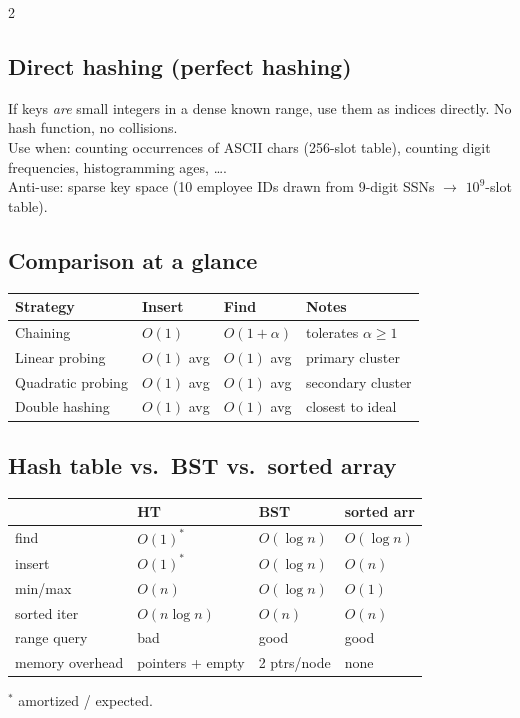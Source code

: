 \documentclass[10pt]{article}
\begin{document}
\begin{multicols}{2}
\subsection*{Direct hashing (perfect hashing)}
If keys \emph{are} small integers in a dense known range, use them as
indices directly. No hash function, no collisions.\\
Use when: counting occurrences of ASCII chars (256-slot table),
counting digit frequencies, histogramming ages, \ldots.\\
Anti-use: sparse key space (10 employee IDs drawn from 9-digit SSNs
$\to$ $10^9$-slot table).

\subsection*{Comparison at a glance}
\begin{tabular}{@{}l|lll@{}}
\textbf{Strategy}   & \textbf{Insert} & \textbf{Find}   & \textbf{Notes}\\
\hline
Chaining            & $O(1)$          & $O(1+\alpha)$   & tolerates $\alpha \geq 1$\\
Linear probing      & $O(1)$ avg      & $O(1)$ avg      & primary cluster\\
Quadratic probing   & $O(1)$ avg      & $O(1)$ avg      & secondary cluster\\
Double hashing      & $O(1)$ avg      & $O(1)$ avg      & closest to ideal
\end{tabular}

\subsection*{Hash table vs.\ BST vs.\ sorted array}
\begin{tabular}{@{}l|lll@{}}
                      & \textbf{HT}       & \textbf{BST}      & \textbf{sorted arr}\\
\hline
find                  & $O(1)^*$          & $O(\log n)$       & $O(\log n)$\\
insert                & $O(1)^*$          & $O(\log n)$       & $O(n)$\\
min/max               & $O(n)$            & $O(\log n)$       & $O(1)$\\
sorted iter           & $O(n \log n)$     & $O(n)$            & $O(n)$\\
range query           & bad               & good              & good\\
memory overhead       & pointers + empty  & 2 ptrs/node       & none
\end{tabular}
$^*$ amortized / expected.


\end{multicols}
\end{document}
